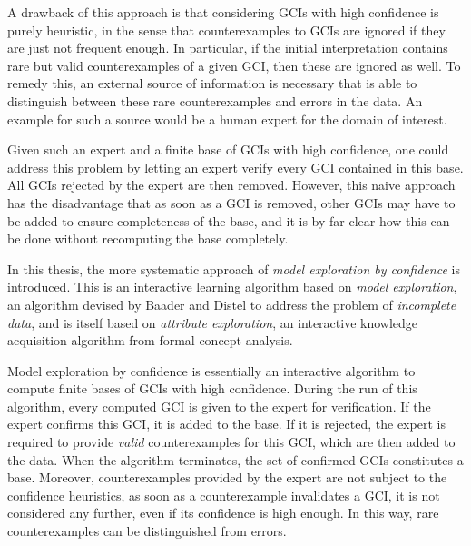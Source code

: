 \documentclass[english,fleqn]{scrartcl}
\begin{document}
A drawback of this approach is that considering GCIs with high confidence is purely
heuristic, in the sense that counterexamples to GCIs are ignored if they are just not
frequent enough.  In particular, if the initial interpretation contains rare but valid
counterexamples of a given GCI, then these are ignored as well.  To remedy this, an
external source of information is necessary that is able to distinguish between these rare
counterexamples and errors in the data.  An example for such a source would be a human
expert for the domain of interest.

Given such an expert and a finite base of GCIs with high confidence, one could address
this problem by letting an expert verify every GCI contained in this base.  All GCIs
rejected by the expert are then removed.  However, this naive approach has the
disadvantage that as soon as a GCI is removed, other GCIs may have to be added to ensure
completeness of the base, and it is by far clear how this can be done without recomputing
the base completely.

In this thesis, the more systematic approach of \emph{model exploration by confidence} is
introduced.  This is an interactive learning algorithm based on \emph{model exploration},
an algorithm devised by Baader and Distel to address the problem of \emph{incomplete
  data}, and is itself based on \emph{attribute exploration}, an interactive knowledge
acquisition algorithm from formal concept analysis.

Model exploration by confidence is essentially an interactive algorithm to compute finite
bases of GCIs with high confidence.  During the run of this algorithm, every computed GCI
is given to the expert for verification.  If the expert confirms this GCI, it is added to
the base.  If it is rejected, the expert is required to provide \emph{valid}
counterexamples for this GCI, which are then added to the data.  When the algorithm
terminates, the set of confirmed GCIs constitutes a base.  Moreover, counterexamples
provided by the expert are not subject to the confidence heuristics, \ie as soon as a
counterexample invalidates a GCI, it is not considered any further, even if its confidence
is high enough.  In this way, rare counterexamples can be distinguished from errors.

\printbibliography{}
\end{document}

